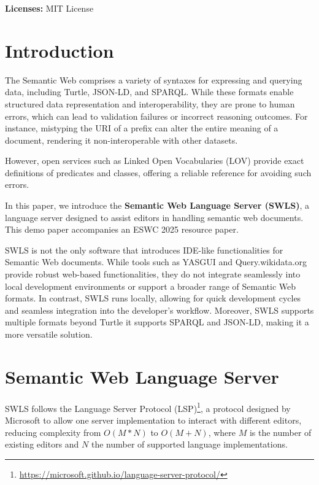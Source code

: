 \textbf{Licenses:} MIT License


\section{Introduction}%
\label{sec:introduction}

The Semantic Web comprises a variety of syntaxes for expressing and querying data, including Turtle, JSON-LD, and SPARQL. While these formats enable structured data representation and interoperability, they are prone to human errors, which can lead to validation failures or incorrect reasoning outcomes. For instance, mistyping the URI of a prefix can alter the entire meaning of a document, rendering it non-interoperable with other datasets. 

However, open services such as Linked Open Vocabularies (LOV)\cite{LOV2017} provide exact definitions of predicates and classes, offering a reliable reference for avoiding such errors.

In this paper, we introduce the \textbf{Semantic Web Language Server (SWLS)}, a language server designed to assist editors in handling semantic web documents. This demo paper accompanies an ESWC 2025 resource paper.

SWLS is not the only software that introduces IDE-like functionalities for Semantic Web documents. While tools such as YASGUI\cite{yasgui,10.1007/978-3-642-41242-4_7} and Query.wikidata.org provide robust web-based functionalities, they do not integrate seamlessly into local development environments or support a broader range of Semantic Web formats. In contrast, SWLS runs locally, allowing for quick development cycles and seamless integration into the developer's workflow. Moreover, SWLS supports multiple formats beyond Turtle it supports SPARQL and JSON-LD, making it a more versatile solution.

\section{Semantic Web Language Server}

SWLS follows the Language Server Protocol (LSP)\cite{IntroToLsp}\footnote{\url{https://microsoft.github.io/language-server-protocol/}}, a protocol designed by Microsoft to allow one server implementation to interact with different editors, reducing complexity from $O(M*N)$ to $O(M+N)$, where $M$ is the number of existing editors and $N$ the number of supported language implementations.

